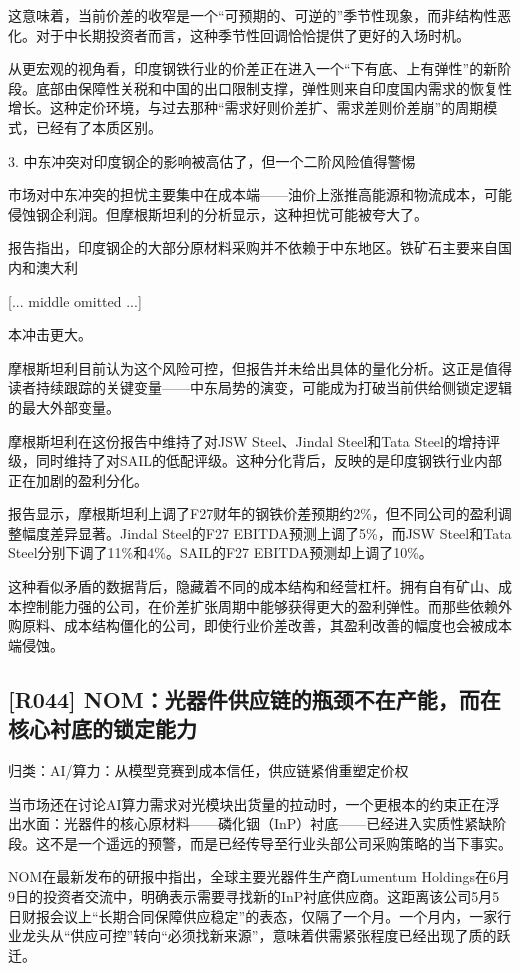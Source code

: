 \documentclass[11pt]{ctexart}
\begin{document}
这意味着，当前价差的收窄是一个“可预期的、可逆的”季节性现象，而非结构性恶化。对于中长期投资者而言，这种季节性回调恰恰提供了更好的入场时机。

从更宏观的视角看，印度钢铁行业的价差正在进入一个“下有底、上有弹性”的新阶段。底部由保障性关税和中国的出口限制支撑，弹性则来自印度国内需求的恢复性增长。这种定价环境，与过去那种“需求好则价差扩、需求差则价差崩”的周期模式，已经有了本质区别。

3. 中东冲突对印度钢企的影响被高估了，但一个二阶风险值得警惕

市场对中东冲突的担忧主要集中在成本端——油价上涨推高能源和物流成本，可能侵蚀钢企利润。但摩根斯坦利的分析显示，这种担忧可能被夸大了。

报告指出，印度钢企的大部分原材料采购并不依赖于中东地区。铁矿石主要来自国内和澳大利

[... middle omitted ...]

本冲击更大。

摩根斯坦利目前认为这个风险可控，但报告并未给出具体的量化分析。这正是值得读者持续跟踪的关键变量——中东局势的演变，可能成为打破当前供给侧锁定逻辑的最大外部变量。

摩根斯坦利在这份报告中维持了对JSW Steel、Jindal Steel和Tata Steel的增持评级，同时维持了对SAIL的低配评级。这种分化背后，反映的是印度钢铁行业内部正在加剧的盈利分化。

报告显示，摩根斯坦利上调了F27财年的钢铁价差预期约2\%，但不同公司的盈利调整幅度差异显著。Jindal Steel的F27 EBITDA预测上调了5\%，而JSW Steel和Tata Steel分别下调了11\%和4\%。SAIL的F27 EBITDA预测却上调了10\%。

这种看似矛盾的数据背后，隐藏着不同的成本结构和经营杠杆。拥有自有矿山、成本控制能力强的公司，在价差扩张周期中能够获得更大的盈利弹性。而那些依赖外购原料、成本结构僵化的公司，即使行业价差改善，其盈利改善的幅度也会被成本端侵蚀。

\subsection{[R044] NOM：光器件供应链的瓶颈不在产能，而在核心衬底的锁定能力}
{\small\color{refgray}归类：AI/算力：从模型竞赛到成本信任，供应链紧俏重塑定价权}

当市场还在讨论AI算力需求对光模块出货量的拉动时，一个更根本的约束正在浮出水面：光器件的核心原材料——磷化铟（InP）衬底——已经进入实质性紧缺阶段。这不是一个遥远的预警，而是已经传导至行业头部公司采购策略的当下事实。

NOM在最新发布的研报中指出，全球主要光器件生产商Lumentum Holdings在6月9日的投资者交流中，明确表示需要寻找新的InP衬底供应商。这距离该公司5月5日财报会议上“长期合同保障供应稳定”的表态，仅隔了一个月。一个月内，一家行业龙头从“供应可控”转向“必须找新来源”，意味着供需紧张程度已经出现了质的跃迁。
\end{document}
